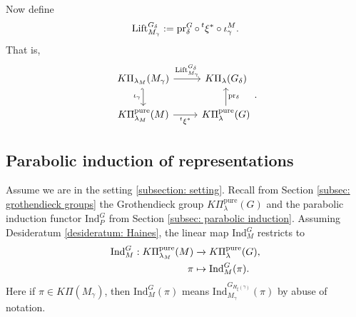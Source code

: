 \documentclass[11pt,letterpaper]{amsart}
\newcommand{\pure}{\mathrm{pure}}
\newcommand{\Ind}{\mathrm{Ind}}
\newcommand{\Lift}{\mathrm{Lift}}
\renewcommand{\1}{\mathbbm{1}}
\numberwithin{equation}{section}
\begin{document}
{Now define
\begin{equation}\label{equation: lift}
 \Lift_{M_\gamma}^{G_\delta}:=\operatorname{pr}^G_\delta \circ \prescript{t}{}{\xi}^* \circ\iota^M_\gamma.
\end{equation}
That is,
\[\begin{tikzcd}
	{K\Pi_{\lambda_{M}}(M_\gamma)} & {K\Pi_\lambda(G_\delta)} \\
	{K\Pi_{\lambda_{M}}^{\pure}(M)} & {K\Pi^\pure_\lambda(G)}
	\arrow["{\Lift_{M_\gamma}^{G_\delta}}", from=1-1, to=1-2]
	\arrow["\iota_\gamma"', hook', from=1-1, to=2-1]
	\arrow["{\prescript{t}{}{\xi^*}}"', from=2-1, to=2-2]
	\arrow["{\operatorname{pr_\delta}}"', from=2-2, to=1-2]
\end{tikzcd}.\]

\subsection{Parabolic induction of representations}\label{subsec: parabolic induction of reps linear map}
Assume we are in the setting \ref{subsection: setting}. Recall from Section  {\ref{subsec: grothendieck groups}} the Grothendieck group $K\Pi_{\lambda}^\pure(G)$ and the parabolic induction functor $\Ind_P^G$ from Section \ref{subsec: parabolic induction}. Assuming Desideratum \ref{desideratum: Haines}, the linear map $\Ind_M^G$ restricts to
\begin{align}\label{equation: induction definition}
    \Ind_M^G: K\Pi^\pure_{\lambda_M}(M) &\xrightarrow{} K\Pi^\pure_{\lambda}(G),\\
    \pi &\mapsto \Ind_M^G(\pi). {\notag}
\end{align}
Here if $\pi \in K\Pi(M_{\gamma})$, then $\Ind_M^G(\pi)$ means $\Ind_{M_{\gamma}}^{G_{H_{\xi}(\gamma)}}(\pi)$ by abuse of notation. 


}
\end{document}
